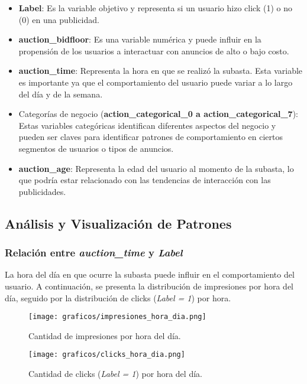 \documentclass[a4paper,11pt]{article}
\begin{document}
\begin{itemize}
    \item \textbf{Label}: Es la variable objetivo y representa si un usuario hizo click (1) o no (0) en una publicidad.
    
    \item \textbf{auction\_bidfloor}: Es una variable numérica y puede influir en la propensión de los usuarios a interactuar con anuncios de alto o bajo costo.
    
    \item \textbf{auction\_time}: Representa la hora en que se realizó la subasta. Esta variable es importante ya que el comportamiento del usuario puede variar a lo largo del día y de la semana.
    
    \item Categorías de negocio (\textbf{action\_categorical\_0 a action\_categorical\_7}): Estas variables categóricas identifican diferentes aspectos del negocio y pueden ser claves para identificar patrones de comportamiento en ciertos segmentos de usuarios o tipos de anuncios.
    
    \item \textbf{auction\_age}: Representa la edad del usuario al momento de la subasta, lo que podría estar relacionado con las tendencias de interacción con las publicidades.
\end{itemize}

\subsection{Análisis y Visualización de Patrones}

\subsubsection{Relación entre \textit{auction\_time} y \textit{Label}}

La hora del día en que ocurre la subasta puede influir en el comportamiento del usuario. A continuación, se presenta la distribución de impresiones por hora del día, seguido por la distribución de clicks (\textit{Label = 1}) por hora.

\begin{figure}[H]
    \centering
    \begin{minipage}{0.48\textwidth}
        \centering
        \texttt{[image: graficos/impresiones\_hora\_dia.png]}
        \caption{Cantidad de impresiones por hora del día.}
    \end{minipage}
    \hfill
    \begin{minipage}{0.48\textwidth}
        \centering
        \texttt{[image: graficos/clicks\_hora\_dia.png]}
        \caption{Cantidad de clicks (\textit{Label = 1}) por hora del día.}
    \end{minipage}
\end{figure}
\end{document}
